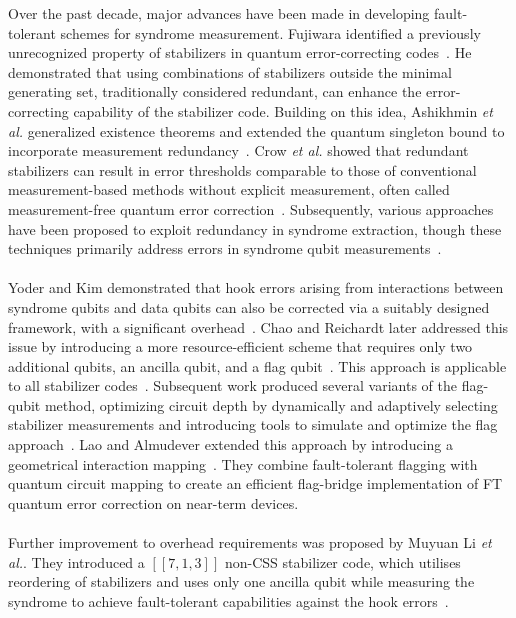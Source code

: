 \documentclass[reprint, amsmath,amssymb, aps,pra,
 floatfix,
]{revtex4-2}
\begin{document}
\noindent Over the past decade, major advances have been made in developing fault-tolerant schemes for syndrome measurement.
Fujiwara identified a previously unrecognized property of stabilizers in quantum error-correcting codes~\cite{fujiwara2014ability}.
He demonstrated that using combinations of stabilizers outside the minimal generating set, traditionally considered redundant, can enhance the error-correcting capability of the stabilizer code.
Building on this idea, Ashikhmin \emph{et al.} generalized existence theorems and extended the quantum singleton bound to incorporate measurement redundancy~\cite{ashikhmin2014robust}.
Crow \emph{et al.} showed that redundant stabilizers can result in error thresholds comparable to those of conventional measurement-based methods without explicit measurement, often called measurement-free quantum error correction~\cite{crow2016improved}.
Subsequently, various approaches have been proposed to exploit redundancy in syndrome extraction, though these techniques primarily address errors in syndrome qubit measurements~\cite{premakumar20212,guttentag2024robust}.\\\\
\noindent Yoder and Kim demonstrated that hook errors arising from interactions between syndrome qubits and data qubits can also be corrected via a suitably designed framework, with a significant overhead~\cite{Yoder2017surfacecodetwist}.
Chao and Reichardt later addressed this issue by introducing a more resource-efficient scheme that requires only two additional qubits, an ancilla qubit, and a flag qubit~\cite{PhysRevLett.121.050502}.
This approach is applicable to all stabilizer codes~\cite{chamberland2017flag,chao2020flag}.
Subsequent work produced several variants of the flag-qubit method, optimizing circuit depth by dynamically and adaptively selecting stabilizer measurements and introducing tools to simulate and optimize the flag approach~\cite{debroy2020extended,bhatnagar2023low,WOS:001379568200001,WOS:001317800000001,pato2024optimization}.
Lao and Almudever extended this approach by introducing a geometrical interaction mapping~\cite{PhysRevA.101.032333}.
They combine fault-tolerant flagging with quantum circuit mapping to create an efficient flag-bridge implementation of FT quantum error correction on near-term devices.\\\\
\noindent Further improvement to overhead requirements was proposed by Muyuan Li \emph{et al.}.
They introduced a $[[7,1,3]]$  non-CSS stabilizer code, which utilises reordering of stabilizers and uses only one ancilla qubit while measuring the syndrome to achieve fault-tolerant capabilities against the hook errors~\cite{Muyuna}. 
\end{document}

